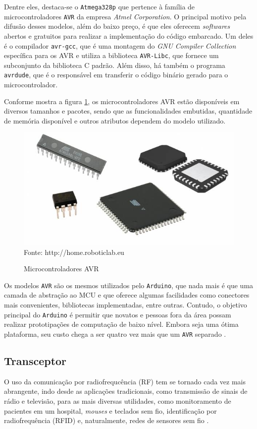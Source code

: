 Dentre eles, destaca-se o \texttt{Atmega328p} que pertence à família de microcontroladores \texttt{AVR} da
empresa \textit{Atmel Corporation}. O principal motivo pela difusão desses modelos, além do baixo preço, é que
eles oferecem \textit{softwares} abertos e gratuitos para realizar a implementação do código embarcado. Um
deles é o compilador \texttt{avr-gcc}, que é uma montagem do \textit{GNU Compiler Collection} específica para
os AVR e utiliza a biblioteca \texttt{AVR-Libc}, que fornece um subconjunto da biblioteca C padrão. Além
disso, há também o programa \texttt{avrdude}, que é o responsável em transferir o código binário gerado para o
microcontrolador.

Conforme mostra a figura \ref{figura:avr}, os microcontroladores AVR estão disponíveis em diversos tamanhos e
pacotes, sendo que as funcionalidades embutidas, quantidade de memória disponível e outros atributos dependem
do modelo utilizado.

\begin{figure}[h]
	\caption{Microcontroladores AVR}
	\centering
	\includegraphics[scale=0.5]{../images/avr.jpg}
	\hspace{\linewidth}
	Fonte: http://home.roboticlab.eu
	\label{figura:avr}
\end{figure}

Os modelos \texttt{AVR} são os mesmos utilizados pelo \texttt{Arduino}, que nada mais é que uma camada de
abstração ao MCU e que oferece algumas facilidades como conectores mais convenientes, bibliotecas
implementadas, entre outras.  Contudo, o objetivo principal do \texttt{Arduino} é permitir que novatos e
pessoas fora da área possam realizar prototipações de computação de baixo nível. Embora seja uma ótima
plataforma, seu custo chega a ser quatro vez mais que um \texttt{AVR} separado \cite{trevennor2012}.

\subsection{Transceptor}
O uso da comunicação por radiofrequcência (RF) tem se tornado cada vez mais abrangente, indo desde as
aplicações tradicionais, como transmissão de sinais de rádio e televisão, para as mais diversas utilidades,
como monitoramento de pacientes em um hospital, \textit{mouses} e teclados sem fio, identificação por
radiofrequência (RFID) e, naturalmente, redes de sensores sem fio \cite{misra2001}.

